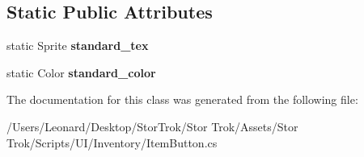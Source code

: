 \subsection*{Static Public Attributes}
\begin{DoxyCompactItemize}
\item 
\mbox{\label{class_item_button_a9ede282a31f62ba70e141178fbd254f8}} 
static Sprite {\bfseries standard\+\_\+tex}
\item 
\mbox{\label{class_item_button_a2a0f2f1514aacbdd93e523d9619da602}} 
static Color {\bfseries standard\+\_\+color}
\end{DoxyCompactItemize}


The documentation for this class was generated from the following file\+:\begin{DoxyCompactItemize}
\item 
/\+Users/\+Leonard/\+Desktop/\+Stor\+Trok/\+Stor Trok/\+Assets/\+Stor Trok/\+Scripts/\+U\+I/\+Inventory/Item\+Button.\+cs\end{DoxyCompactItemize}
